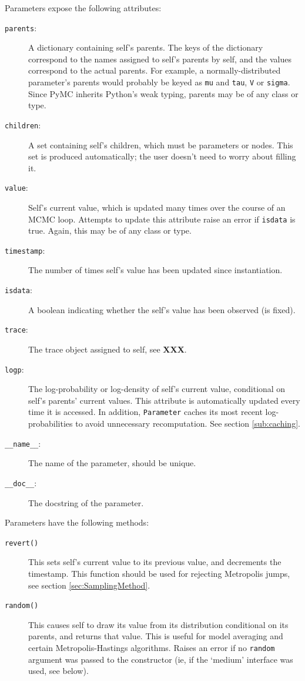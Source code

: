 \documentclass[]{book}
\begin{document}
Parameters expose the following attributes:
\begin{description}
    \item[\texttt{parents}:] A dictionary containing self's parents. The keys of the dictionary correspond to the names assigned to self's parents by self, and the values correspond to the actual parents. For example, a normally-distributed parameter's parents would probably be keyed as \texttt{mu} and \texttt{tau}, \texttt{V} or \texttt{sigma}. Since PyMC inherits Python's weak typing, parents may be of any class or type.
    \item[\texttt{children}:] A set containing self's children, which must be parameters or nodes. This set is produced automatically; the user doesn't need to worry about filling it.
    \item[\texttt{value}:] Self's current value, which is updated many times over the course of an MCMC loop. Attempts to update this attribute raise an error if \texttt{isdata} is true. Again, this may be of any class or type.
    \item[\texttt{timestamp}:] The number of times self's value has been updated since instantiation.
    \item[\texttt{isdata}:] A boolean indicating whether the self's value has been observed (is fixed).
    \item[\texttt{trace}:] The trace object assigned to self, see \textbf{XXX}.
    \item[\texttt{logp}:] The log-probability or log-density of self's current value, conditional on self's parents' current values. This attribute is automatically updated every time it is accessed. In addition, \texttt{Parameter} caches its most recent log-probabilities to avoid unnecessary recomputation. See section \ref{sub:caching}.
    \item[\texttt{\_\_name\_\_}:] The name of the parameter, should be unique.
    \item[\texttt{\_\_doc\_\_}:] The docstring of the parameter.
\end{description}

Parameters have the following methods:
\begin{description}
    \item[\texttt{revert()}] This sets self's current value to its previous value, and decrements the timestamp. This function should be used for rejecting Metropolis jumps, see section \ref{sec:SamplingMethod}.
    \item[\texttt{random()}] This causes self to draw its value from its distribution conditional on its parents, and returns that value. This is useful for model averaging and certain Metropolis-Hastings algorithms. Raises an error if no \texttt{random} argument was passed to the constructor (ie, if the `medium' interface was used, see below).
\end{description}
\end{document}
